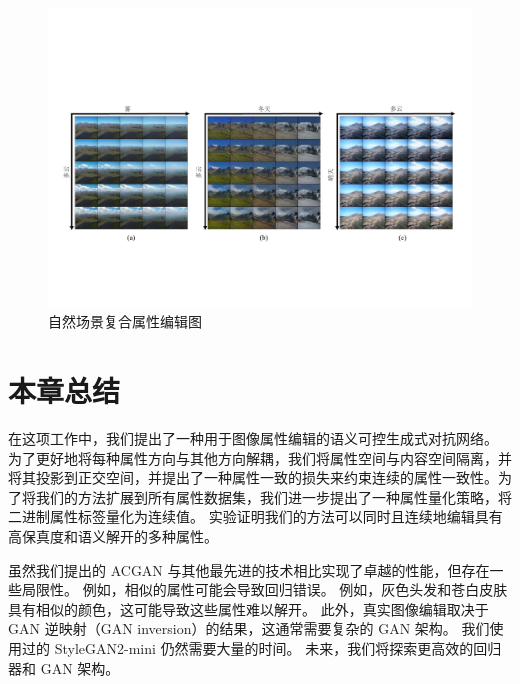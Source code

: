 \begin{figure}[!ht]
	\begin{center}
		 \includegraphics[width=0.9\linewidth]{figures/ACGAN/sceneMulti.pdf}
	\end{center}
	\caption{自然场景复合属性编辑图}
	\label{fig:sceneMulti}
\end{figure}

\section{本章总结}
在这项工作中，我们提出了一种用于图像属性编辑的语义可控生成式对抗网络。 为了更好地将每种属性方向与其他方向解耦，我们将属性空间与内容空间隔离，并将其投影到正交空间，并提出了一种属性一致的损失来约束连续的属性一致性。为了将我们的方法扩展到所有属性数据集，我们进一步提出了一种属性量化策略，将二进制属性标签量化为连续值。 实验证明我们的方法可以同时且连续地编辑具有高保真度和语义解开的多种属性。

虽然我们提出的 ACGAN 与其他最先进的技术相比实现了卓越的性能，但存在一些局限性。 例如，相似的属性可能会导致回归错误。 例如，灰色头发和苍白皮肤具有相似的颜色，这可能导致这些属性难以解开。 此外，真实图像编辑取决于 GAN 逆映射（GAN inversion）的结果，这通常需要复杂的 GAN 架构。 我们使用过的 StyleGAN2-mini 仍然需要大量的时间。 未来，我们将探索更高效的回归器和 GAN 架构。
